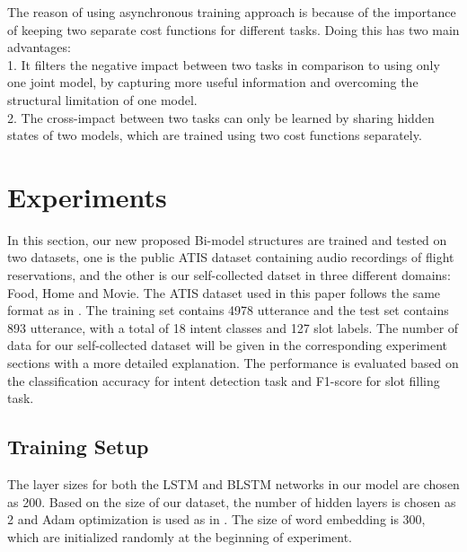 \documentclass[11pt,a4paper]{article}
\begin{document}
The reason of using asynchronous training approach is because of the importance of keeping two separate cost functions for different tasks. Doing this has two main advantages:\\
1. It filters the negative impact between two tasks in comparison to using only one joint model, by capturing more useful information and overcoming the structural limitation of one model.\\
2. The cross-impact between two tasks can only be learned by sharing hidden states of two models, which are trained using two cost functions separately. 
\section{Experiments}
In this section, our new proposed Bi-model structures are trained and tested on two datasets, one is the public ATIS dataset \cite{hemphill1990atis} containing audio recordings of flight reservations, and the other is our self-collected datset in three different domains: Food, Home and Movie. The ATIS dataset used in this paper follows the same format as in \cite{liu2015recurrent, mesnil2015using,xu2013convolutional, liu2016attention}. The training set contains 4978 utterance and the test set contains 893 utterance, with a total of 18 intent classes and 127 slot labels. The number of data for our self-collected dataset will be given in the corresponding experiment sections with a more detailed explanation.
The performance is evaluated based on the classification accuracy for intent detection task and F1-score for slot filling task.
\subsection{Training Setup}
The layer sizes for both the LSTM and BLSTM networks in our model are chosen as 200. Based on the size of our dataset, the number of hidden layers is chosen as 2 and Adam optimization is used as in \cite{kingma2014adam}. The size of word embedding is 300, which are initialized randomly at the beginning of experiment.
\end{document}
